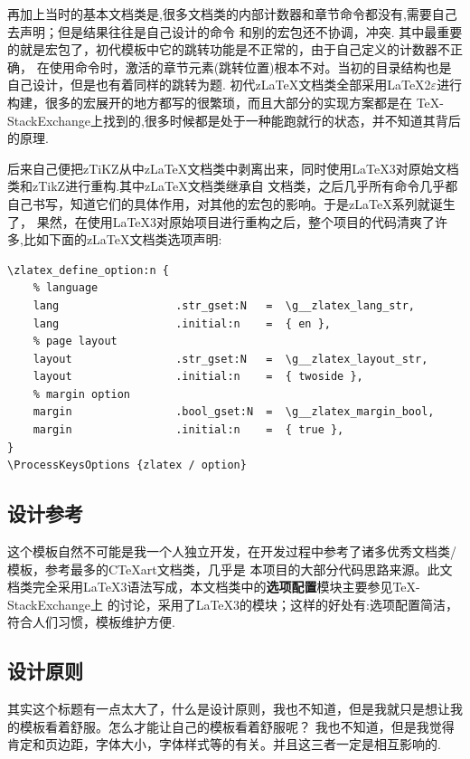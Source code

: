 再加上当时的基本文档类是,很多文档类的内部计数器和章节命令都没有,需要自己去声明；但是结果往往是自己设计的命令
和别的宏包还不协调，冲突. 其中最重要的就是宏包了，初代模板中它的跳转功能是不正常的，由于自己定义的计数器不正确，
在使用\cmd{\label}命令时，激活的章节元素(跳转位置)根本不对。当初的目录结构也是自己设计，但是也有着同样的跳转为题.
初代z\LaTeX{}文档类全部采用\LaTeX{}2$\varepsilon$进行构建，很多的宏展开的地方都写的很繁琐，而且大部分的实现方案都是在
\TeX-StackExchange上找到的,很多时候都是处于一种能跑就行的状态，并不知道其背后的原理. 

后来自己便把zTiKZ从中z\LaTeX{}文档类中剥离出来，同时使用\LaTeX{}3对原始文档类和zTikZ进行重构.其中z\LaTeX{}文档类继承自
文档类，之后几乎所有命令几乎都自己书写，知道它们的具体作用，对其他的宏包的影响。于是z\LaTeX{}系列就诞生了，
果然，在使用\LaTeX3对原始项目进行重构之后，整个项目的代码清爽了许多,比如下面的z\LaTeX{}文档类选项声明:

\begin{verbatim}
\zlatex_define_option:n {
    % language
    lang                  .str_gset:N   =  \g__zlatex_lang_str,
    lang                  .initial:n    =  { en },
    % page layout
    layout                .str_gset:N   =  \g__zlatex_layout_str,
    layout                .initial:n    =  { twoside },
    % margin option
    margin                .bool_gset:N  =  \g__zlatex_margin_bool,
    margin                .initial:n    =  { true },
}
\ProcessKeysOptions {zlatex / option}
\end{verbatim}

\subsection{设计参考}
这个模板自然不可能是我一个人独立开发，在开发过程中参考了诸多优秀文档类/模板，参考最多的{C\TeX{}art}文档类，几乎是
本项目的大部分代码思路来源。此文档类完全采用\LaTeX3语法写成，本文档类中的\textbf{选项配置}模块主要参见\TeX-StackExchange上
的讨论，采用了\LaTeX3的模块；这样的好处有:选项配置简洁，符合人们习惯，模板维护方便.


\subsection{设计原则}
其实这个标题有一点太大了，什么是设计原则，我也不知道，但是我就只是想让我的模板看着舒服。怎么才能让自己的模板看着舒服呢？
我也不知道，但是我觉得肯定和页边距，字体大小，字体样式等的有关。并且这三者一定是相互影响的. 

